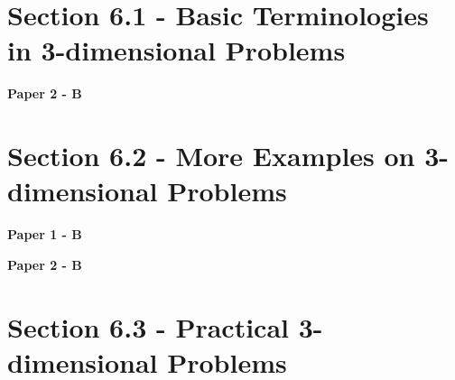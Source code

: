 \documentclass[12pt, a4paper]{article}
\begin{document}
\section*{Section 6.1 - Basic Terminologies in 3-dimensional Problems \NF}\label{section:5-6-1}

\textbf{Paper 2 - B}
\begin{enumx}[label=\arabic*.,start=1]
\item {}\label{DSE2012-CoreP2-Q40} 
\item {}\label{DSE2019-CoreP2-Q40} 
\end{enumx}




\section*{Section 6.2 - More Examples on 3-dimensional Problems \NF}\label{section:5-6-2}

\textbf{Paper 1 - B}
\begin{enumx}[label=\arabic*.,start=3]
\item {}\label{DSE2012P-CoreP1-Q18} 
\item {}\label{DSE2019-CoreP1-Q18} 
\item {}\label{DSE2021-CoreP1-Q18} 
\end{enumx}
\textbf{Paper 2 - B}
\begin{enumx}[label=\arabic*.,start=6]
\item {}\label{DSE2014-CoreP2-Q40} 
\item {}\label{DSE2016-CoreP2-Q39} 
\end{enumx}




\section*{Section 6.3 - Practical 3-dimensional Problems \NF}\label{section:5-6-3}
\end{document}
